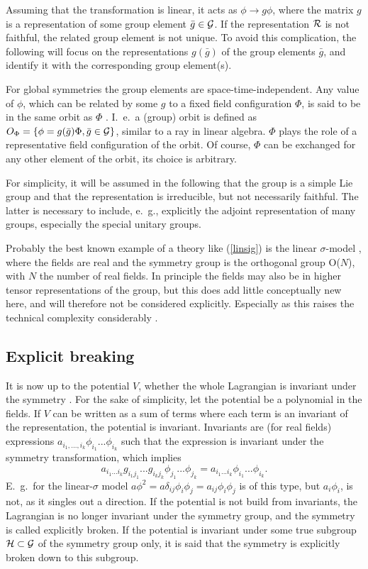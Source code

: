 \documentclass[final,12pt]{article}
\newcommand*{\no}{\noindent}
\newcommand*{\be}{\begin{equation}}
\newcommand*{\ee}{\end{equation}}
\newcommand*{\pref}[1]{(\ref{#1})}
\newcommand*{\nn}{\nonumber}
\newcommand*{\1}{1\!\!\!\bot}
\begin{document}
Assuming that the transformation is linear, it acts as $\phi\to g\phi$, where the matrix $g$ is a representation of some group element $\bar{g}\in{\cal G}$. If the representation ${\cal R}$ is not faithful, the related group element is not unique. To avoid this complication, the following will focus on the representations $g(\bar{g})$ of the group elements $\bar{g}$, and identify it with the corresponding group element(s).

For global symmetries the group elements are space-time-independent. Any value of $\phi$, which can be related by some $g$ to a fixed field configuration $\Phi$, is said to be in the same orbit as $\Phi$ \cite{O'Raifeartaigh:1978kv}. I.\ e.\ a (group) orbit is defined as $O_\Phi=\{\phi=g(\bar{g})\Phi,\bar{g}\in{\cal G}\}$, similar to a ray in linear algebra. $\Phi$ plays the role of a representative field configuration of the orbit. Of course, $\Phi$ can be exchanged for any other element of the orbit, its choice is arbitrary.

For simplicity, it will be assumed in the following that the group is a simple Lie group and that the representation is irreducible, but not necessarily faithful. The latter is necessary to include, e.\ g., explicitly the adjoint representation of many groups, especially the special unitary groups.

Probably the best known example of a theory like \pref{linsig} is the linear $\sigma$-model \cite{Bohm:2001yx}, where the fields are real and the symmetry group is the orthogonal group O($N$), with $N$ the number of real fields. In principle the fields may also be in higher tensor representations of the group, but this does add little conceptually new here, and will therefore not be considered explicitly. Especially as this raises the technical complexity considerably \cite{O'Raifeartaigh:1978kv}. 

\subsection{Explicit breaking}\label{ss:gsym}

It is now up to the potential $V$, whether the whole Lagrangian is invariant under the symmetry \cite{O'Raifeartaigh:1978kv,Sartori:1992ib}. For the sake of simplicity, let the potential be a polynomial in the fields. If $V$ can be written as a sum of terms where each term is an invariant of the representation, the potential is invariant. Invariants are (for real fields) expressions $a_{i_1,...,i_k}\phi_{i_1}...\phi_{i_k}$ such that the expression is invariant under the symmetry transformation, which implies
\be
a_{i_1...i_k}g_{i_1 j_1}...g_{i_kj_k}\phi_{j_1}...\phi_{j_k}=a_{i_1...i_k}\phi_{i_1}...\phi_{i_k}\nn.
\ee
\no E.\ g.\ for the linear-$\sigma$ model $a\phi^2=a\delta_{ij}\phi_i\phi_j=a_{ij}\phi_i\phi_j$ is of this type, but $a_i\phi_i$, is not, as it singles out a direction. If the potential is not build from invariants, the Lagrangian is no longer invariant under the symmetry group, and the symmetry is called explicitly broken. If the potential is invariant under some true subgroup ${\cal H}\subset{\cal G}$ of the symmetry group only, it is said that the symmetry is explicitly broken down to this subgroup.
\end{document}
